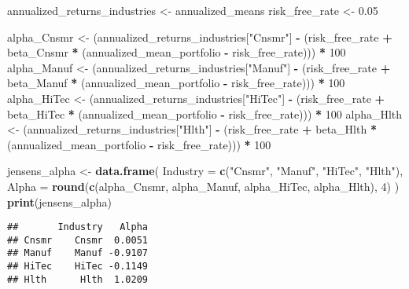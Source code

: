 \documentclass[
]{article}
\newenvironment{Shaded}{\begin{snugshade}}{\end{snugshade}}
\newcommand{\AttributeTok}[1]{\textcolor[rgb]{0.13,0.29,0.53}{#1}}
\newcommand{\DecValTok}[1]{\textcolor[rgb]{0.00,0.00,0.81}{#1}}
\newcommand{\FloatTok}[1]{\textcolor[rgb]{0.00,0.00,0.81}{#1}}
\newcommand{\FunctionTok}[1]{\textcolor[rgb]{0.13,0.29,0.53}{\textbf{#1}}}
\newcommand{\NormalTok}[1]{#1}
\newcommand{\OtherTok}[1]{\textcolor[rgb]{0.56,0.35,0.01}{#1}}
\newcommand{\SpecialCharTok}[1]{\textcolor[rgb]{0.81,0.36,0.00}{\textbf{#1}}}
\newcommand{\StringTok}[1]{\textcolor[rgb]{0.31,0.60,0.02}{#1}}
\begin{document}
\begin{Shaded}
\begin{Highlighting}[]
\NormalTok{annualized\_returns\_industries }\OtherTok{\textless{}{-}}\NormalTok{ annualized\_means}
\NormalTok{risk\_free\_rate }\OtherTok{\textless{}{-}} \FloatTok{0.05}

\NormalTok{alpha\_Cnsmr }\OtherTok{\textless{}{-}}\NormalTok{ (annualized\_returns\_industries[}\StringTok{"Cnsmr"}\NormalTok{] }\SpecialCharTok{{-}}\NormalTok{ (risk\_free\_rate }\SpecialCharTok{+}\NormalTok{ beta\_Cnsmr }\SpecialCharTok{*}\NormalTok{ (annualized\_mean\_portfolio }\SpecialCharTok{{-}}\NormalTok{ risk\_free\_rate))) }\SpecialCharTok{*} \DecValTok{100}
\NormalTok{alpha\_Manuf }\OtherTok{\textless{}{-}}\NormalTok{ (annualized\_returns\_industries[}\StringTok{"Manuf"}\NormalTok{] }\SpecialCharTok{{-}}\NormalTok{ (risk\_free\_rate }\SpecialCharTok{+}\NormalTok{ beta\_Manuf }\SpecialCharTok{*}\NormalTok{ (annualized\_mean\_portfolio }\SpecialCharTok{{-}}\NormalTok{ risk\_free\_rate))) }\SpecialCharTok{*} \DecValTok{100}
\NormalTok{alpha\_HiTec }\OtherTok{\textless{}{-}}\NormalTok{ (annualized\_returns\_industries[}\StringTok{"HiTec"}\NormalTok{] }\SpecialCharTok{{-}}\NormalTok{ (risk\_free\_rate }\SpecialCharTok{+}\NormalTok{ beta\_HiTec }\SpecialCharTok{*}\NormalTok{ (annualized\_mean\_portfolio }\SpecialCharTok{{-}}\NormalTok{ risk\_free\_rate))) }\SpecialCharTok{*} \DecValTok{100}
\NormalTok{alpha\_Hlth }\OtherTok{\textless{}{-}}\NormalTok{ (annualized\_returns\_industries[}\StringTok{"Hlth"}\NormalTok{] }\SpecialCharTok{{-}}\NormalTok{ (risk\_free\_rate }\SpecialCharTok{+}\NormalTok{ beta\_Hlth }\SpecialCharTok{*}\NormalTok{ (annualized\_mean\_portfolio }\SpecialCharTok{{-}}\NormalTok{ risk\_free\_rate))) }\SpecialCharTok{*} \DecValTok{100}

\NormalTok{jensens\_alpha }\OtherTok{\textless{}{-}} \FunctionTok{data.frame}\NormalTok{(}
  \AttributeTok{Industry =} \FunctionTok{c}\NormalTok{(}\StringTok{"Cnsmr"}\NormalTok{, }\StringTok{"Manuf"}\NormalTok{, }\StringTok{"HiTec"}\NormalTok{, }\StringTok{"Hlth"}\NormalTok{),}
  \AttributeTok{Alpha =} \FunctionTok{round}\NormalTok{(}\FunctionTok{c}\NormalTok{(alpha\_Cnsmr, alpha\_Manuf, alpha\_HiTec, alpha\_Hlth), }\DecValTok{4}\NormalTok{)}
\NormalTok{)}
\FunctionTok{print}\NormalTok{(jensens\_alpha)}
\end{Highlighting}
\end{Shaded}

\begin{verbatim}
##       Industry   Alpha
## Cnsmr    Cnsmr  0.0051
## Manuf    Manuf -0.9107
## HiTec    HiTec -0.1149
## Hlth      Hlth  1.0209
\end{verbatim}
\end{document}
